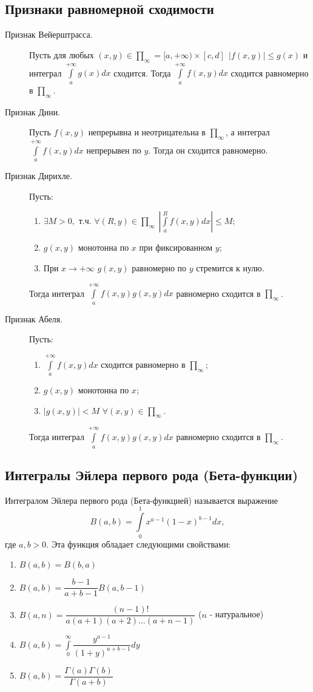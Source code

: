 \documentclass[a4paper,12pt]{scrartcl}
\begin{document}
\subsection{Признаки равномерной сходимости}
\begin{description}
 \item[Признак Вейерштрасса.] Пусть для любых $(x,y)\in\prod_{\infty}=[a,+\infty)\times[c,d]\ \  |f(x,y)| \leqslant g(x)$ и интеграл $\int\limits_{a}^{+\infty}g(x)dx$ сходится. Тогда  $\int\limits_{a}^{+\infty}f(x,y)dx$ сходится равномерно в $\prod_{\infty}$.
\item[Признак Дини.] Пусть $f(x,y)$ непрерывна и неотрицательна в $\prod_{\infty}$, а интеграл $\int\limits_{a}^{+\infty}f(x,y)dx$ непрерывен по $y$. Тогда он сходится равномерно.
\item[Признак Дирихле.] Пусть:\begin{enumerate}
 \item $\exists M > 0,$ т.ч. $\forall (R,y)\in\prod_{\infty}\  \left|\int\limits_{a}^{R}f(x,y)dx\right| \leqslant M;$
\item $g(x,y)$ монотонна по $x$ при фиксированном $y$;
\item При $x\to+\infty$ $g(x,y)$ равномерно по $y$ стремится к нулю.
\end{enumerate}
Тогда интеграл $\int\limits_{a}^{+\infty}f(x,y)g(x,y)dx$ равномерно сходится в $\prod_{\infty}$.
\item[Признак Абеля.] Пусть:
\begin{enumerate}
\item $\int\limits_a^{+\infty}f(x,y)dx$ сходится равномерно в $\prod_{\infty}$;
\item $g(x,y)$ монотонна по $x$;
\item $|g(x,y)| < M $ $\forall (x,y)\in\prod_\infty$.
\end{enumerate}
Тогда интеграл $\int\limits_{a}^{+\infty}f(x,y)g(x,y)dx$ равномерно сходится в $\prod_{\infty}$.
\end{description}
\subsection{Интегралы Эйлера первого рода (Бета-функции)}
Интегралом Эйлера первого рода (Бета-функцией) называется выражение 
$$ B(a,b) =\int\limits_{0}^{1}x^{a-1}(1-x)^{b-1}dx,$$ где $a,b>0$.
Эта функция обладает следующими свойствами:
\begin{enumerate}
\item $B(a,b) = B(b,a)$
\item $B(a,b) = \dfrac{b-1}{a+b-1}B(a,b-1)$ 
\item $B(a,n) = \dfrac{(n-1)!}{a(a+1)(a+2)\ldots(a+n-1)}$ ($n$ - натуральное)
\item $B(a,b) = \int\limits_{0}^{\infty}\dfrac{y^{a-1}}{(1+y)^{a+b-1}}dy$
\item $B(a,b) = \dfrac{\Gamma(a)\Gamma(b)}{\Gamma(a+b)}$
\end{enumerate}
\end{document}

